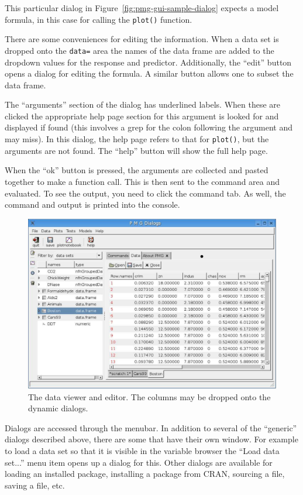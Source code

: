 \documentclass[12pt]{article}
\newcommand{\RFunc}[1]{\texttt{#1()}}
\begin{document}
\begin{description}
 

  
  This particular dialog in Figure~\ref{fig:pmg-gui-sample-dialog}
  expects a model formula, in this case for calling the \RFunc{plot}
  function.

  There are some conveniences for editing the information. When a data
  set is dropped onto the \verb+data=+ area the names of the data
  frame are added to the dropdown values for the response and
  predictor. Additionally, the ``edit'' button opens a dialog for
  editing the formula. A similar button allows one to subset the data
  frame.

  The ``arguments'' section of the dialog has underlined labels. When
  these are clicked the appropriate help page section for this
  argument is looked for and displayed if found (this involves a grep
  for the colon following the argument and may miss). In this dialog, the
  help page refers to that for \verb+plot()+, but the arguments are
  not found. The ``help'' button will show the full help page.

  When  the ``ok'' button is pressed, the arguments are collected and
  pasted together to make a function call. This is then sent to the
  command area and evaluated. To see the output, you need to click the
  command tab. As well, the command and output is printed into the
  console. 
\end{description}

\begin{figure}[htbp]
  \centering
  \includegraphics[width=.8\textwidth]{pmg-dataviewer}
  \caption{The data viewer and editor. The columns may be dropped onto
  the dynamic dialogs.}
  \label{fig:pmg-gui-pmg-dataviewer}
\end{figure}


Dialogs are accessed through the menubar. In addition to several of
the ``generic'' dialogs described above, there are some that have
their own window. For example to load a data set so that it is visible
in the variable browser the ``Load data set...''  menu item opens up a
dialog for this. Other dialogs are available for loading an installed
package, installing a package from  CRAN, sourcing a file, saving a
file, etc.
\end{document}
